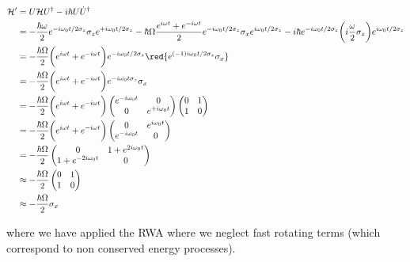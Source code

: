   \begin{equation}\label{app2New}
  	\begin{aligned}
  	\mathcal{H'} & = U\mathcal{H}U^{\dagger} - i\hbar U\dot{U}^{\dagger}\\
  	& = -\frac{\hbar\omega}{2}e^{-i\omega_0t/2\sigma_z}\sigma_ze^{+i\omega_0t/2\sigma_z}-\hbar\Omega\frac{e^{i\omega t}+e^{-i\omega t}}{2}e^{-i\omega_0t/2\sigma_z}\sigma_xe^{i\omega_0t/2\sigma_z}- i\hbar e^{-i\omega_0t/2\sigma_z}\bigg(i\frac{\omega}{2}\sigma_z\bigg)e^{i\omega_0t/2\sigma_z}\\
  	& = -\frac{\hbar\Omega}{2}\bigg(e^{i\omega t}+e^{-i\omega t}\bigg)e^{-i\omega_0t/2\sigma_z}\red{e^{(-1)i\omega_0t/2\sigma_z}\sigma_x}\\
  	& = -\frac{\hbar\Omega}{2}\bigg(e^{i\omega t}+e^{-i\omega t}\bigg){e^{-i\omega_0t\sigma_z}\sigma_x}\\
  	& =-\frac{\hbar\Omega}{2}\bigg(e^{i\omega t}+e^{-i\omega t}\bigg)\begin{pmatrix}
  	e^{-i\omega_0t}&0\\0&e^{+i\omega_0t}
  	\end{pmatrix}\begin{pmatrix}
  	0&1\\1&0
  	\end{pmatrix}\\
  	& =-\frac{\hbar\Omega}{2}\bigg(e^{i\omega t}+e^{-i\omega t}\bigg)\begin{pmatrix}
  	0&e^{i\omega_0t}\\e^{-i\omega_0t}&0
  	\end{pmatrix}
  	\\
  	& =-\frac{\hbar\Omega}{2}\begin{pmatrix}
  	0&1+e^{2i\omega_0t}\\1+e^{-2i\omega_0t}&0
  	\end{pmatrix}
  	\\
  	& \approx -\frac{\hbar\Omega}{2}\begin{pmatrix}
  	0&1\\1&0
  	\end{pmatrix}
  	\\
  	& \approx -\frac{\hbar\Omega}{2}\sigma_x
  	\end{aligned}
  \end{equation}
  
  \noindent where we have applied the RWA where we neglect fast rotating terms (which correspond to non conserved energy processes). 

